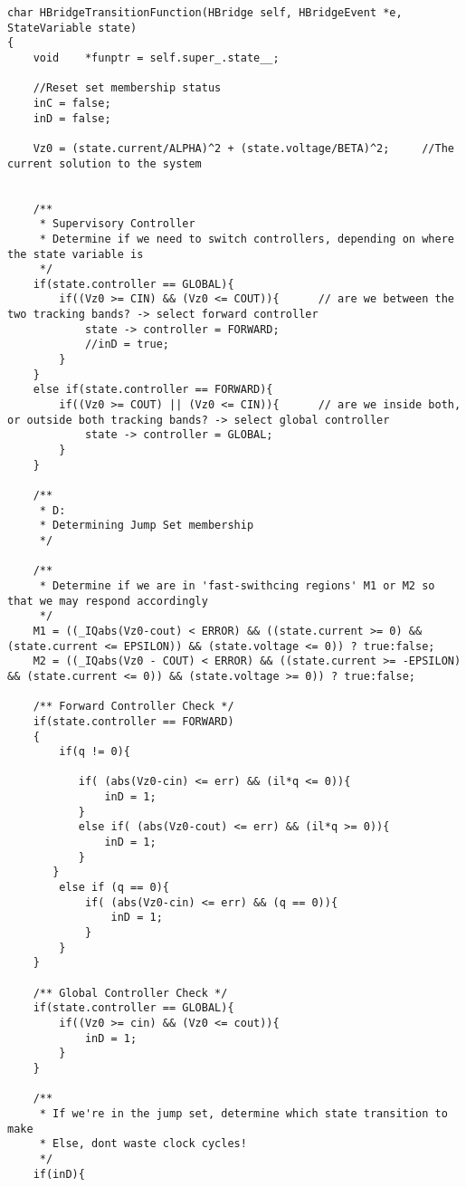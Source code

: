 \begin{lstlisting}
char HBridgeTransitionFunction(HBridge self, HBridgeEvent *e, StateVariable state)
{
    void    *funptr = self.super_.state__;    
    
    //Reset set membership status
    inC = false;   
    inD = false;

    Vz0 = (state.current/ALPHA)^2 + (state.voltage/BETA)^2;		//The current solution to the system


    /**
     * Supervisory Controller 
     * Determine if we need to switch controllers, depending on where the state variable is
     */
    if(state.controller == GLOBAL){
        if((Vz0 >= CIN) && (Vz0 <= COUT)){      // are we between the two tracking bands? -> select forward controller
            state -> controller = FORWARD;
            //inD = true;
        }
    }
    else if(state.controller == FORWARD){
        if((Vz0 >= COUT) || (Vz0 <= CIN)){      // are we inside both, or outside both tracking bands? -> select global controller
            state -> controller = GLOBAL;
        }
    }

    /**
     * D:
     * Determining Jump Set membership
     */
    
    /**
     * Determine if we are in 'fast-swithcing regions' M1 or M2 so that we may respond accordingly
     */
    M1 = ((_IQabs(Vz0-cout) < ERROR) && ((state.current >= 0) && (state.current <= EPSILON)) && (state.voltage <= 0)) ? true:false;
    M2 = ((_IQabs(Vz0 - COUT) < ERROR) && ((state.current >= -EPSILON) && (state.current <= 0)) && (state.voltage >= 0)) ? true:false;

    /** Forward Controller Check */
    if(state.controller == FORWARD)           
    {      
        if(q != 0){

           if( (abs(Vz0-cin) <= err) && (il*q <= 0)){
               inD = 1;
           }
           else if( (abs(Vz0-cout) <= err) && (il*q >= 0)){
               inD = 1;
           }
       }
        else if (q == 0){
            if( (abs(Vz0-cin) <= err) && (q == 0)){
                inD = 1;
            }
        }
    }

    /** Global Controller Check */
    if(state.controller == GLOBAL){
        if((Vz0 >= cin) && (Vz0 <= cout)){
            inD = 1;
        }
    }

    /**
     * If we're in the jump set, determine which state transition to make
     * Else, dont waste clock cycles!
     */
    if(inD){


\end{lstlisting}
